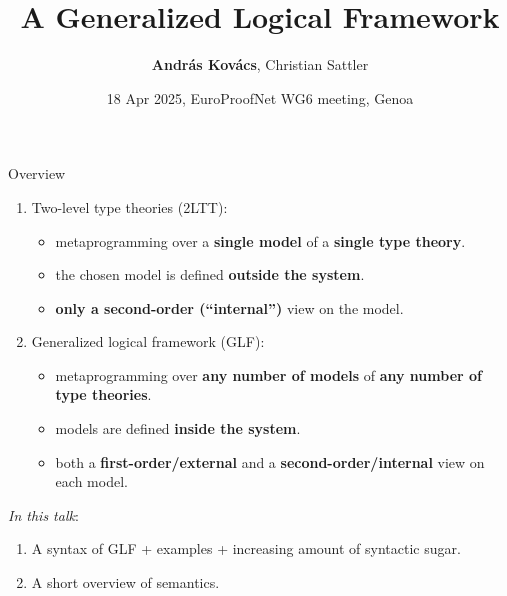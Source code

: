 \documentclass[dvipsnames,aspectratio=169]{beamer}
\title{A Generalized Logical Framework}
\author{\textbf{András Kovács\inst{1}},\,\,Christian Sattler\inst{1}}
\institute{
  \inst{1}%
       {University of Gothenburg \& Chalmers University of Technology}
}
\date{18 Apr 2025, EuroProofNet WG6 meeting, Genoa}
\begin{document}
\frame{\titlepage}

\begin{frame}{Overview}

\begin{enumerate}
\item Two-level type theories (2LTT):
  \begin{itemize}
    \item metaprogramming over a \textbf{single model} of a \textbf{single type theory}.
    \pause
    \item the chosen model is defined \textbf{outside the system}.
    \pause
    \item \textbf{only a second-order (``internal'')} view on the model.
  \end{itemize}
\pause
\item Generalized logical framework (GLF):
  \begin{itemize}
  \item metaprogramming over \textbf{any number of models} of \textbf{any number of type theories}.
    \pause
  \item models are defined \textbf{inside the system}.
    \pause
    \item both a \textbf{first-order/external} and a \textbf{second-order/internal} view on each model.
  \end{itemize}
\end{enumerate}
\pause
\vspace{1em}

\emph{In this talk}:
\begin{enumerate}
\item A syntax of GLF + examples + increasing amount of syntactic sugar.
\item A short overview of semantics.
\end{enumerate}

\end{frame}
\end{document}
